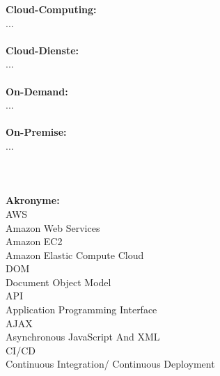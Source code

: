 

\textbf{Cloud-Computing:}\\
...
\\\\
\textbf{Cloud-Dienste:}\\
...
\\\\
\textbf{On-Demand:}\\
...
\\\\
\textbf{On-Premise:}\\
...
\\\\
\\\\
\textbf{Akronyme:}\\
{AWS}\\{Amazon Web Services}\\
{Amazon EC2}\\{Amazon Elastic Compute Cloud }\\
{DOM}\\{Document Object Model}\\
{API}\\{Application Programming Interface}\\
{AJAX}\\{Asynchronous JavaScript And XML}\\
{CI/CD}\\{ Continuous Integration/ Continuous Deployment}\\

